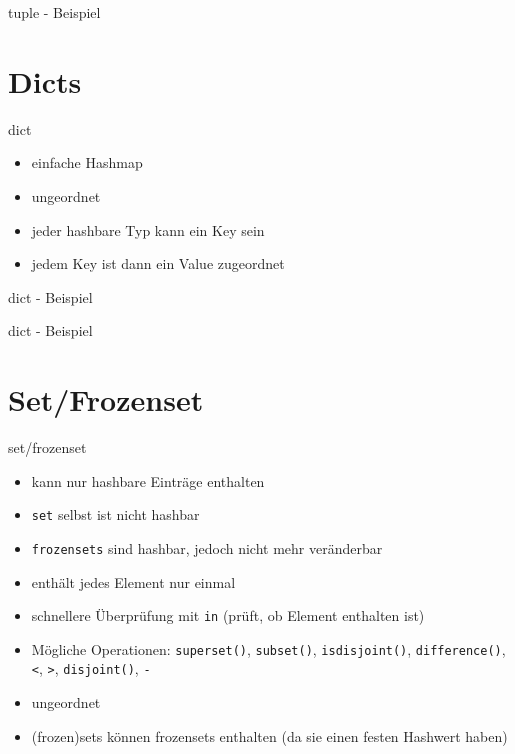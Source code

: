\begin{frame}{tuple - Beispiel}
	
\end{frame}


\section{Dicts}

\begin{frame}{dict}
	\begin{itemize}
		\item einfache Hashmap
		\item ungeordnet
		\item jeder hashbare Typ kann ein Key sein
		\item jedem Key ist dann ein Value zugeordnet
	\end{itemize}
\end{frame}

\begin{frame}{dict - Beispiel}
    
\end{frame}

\begin{frame}{dict - Beispiel}
    
\end{frame}


\section{Set/Frozenset}

\begin{frame}{set/frozenset}
	\begin{itemize}
		\item kann nur hashbare Einträge enthalten
		\item \texttt{set} selbst ist nicht hashbar
		\item \texttt{frozensets} sind hashbar, jedoch nicht mehr veränderbar
		\item enthält jedes Element nur einmal
		\item schnellere Überprüfung mit \alert{\texttt{in}} (prüft, ob Element enthalten ist)
		\item Mögliche Operationen: \alert{\texttt{superset()}}, \alert{\texttt{subset()}}, \alert{\texttt{isdisjoint()}}, \alert{\texttt{difference()}}, \alert{\texttt{<}}, \alert{\texttt{>}}, \alert{\texttt{disjoint()}}, \alert{\texttt{-}}
		\item ungeordnet
		\item (frozen)sets können frozensets enthalten (da sie einen festen Hashwert haben)
	\end{itemize}
\end{frame}

